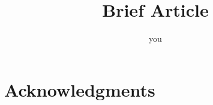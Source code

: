 \documentclass[11pt]{amsart}
\title{Brief Article}
\author{you}
\date{}                                           %
\numberwithin{equation}{section}
\begin{document}
\maketitle


\section*{Acknowledgments}

%
\end{document}
